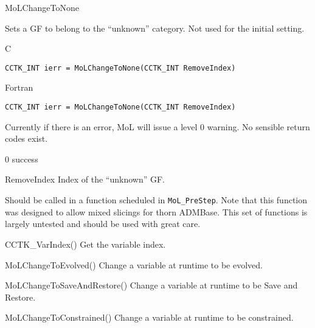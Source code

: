 \begin{FunctionDescription}{MoLChangeToNone}
  \label{CactusBase_MoL_MoLChangeToNone}
  
  Sets a GF to belong to the ``unknown'' category. Not used for the
  initial setting.

  \begin{SynopsisSection}
    \begin{Synopsis}{C}
\begin{verbatim}
CCTK_INT ierr = MoLChangeToNone(CCTK_INT RemoveIndex)
\end{verbatim}
    \end{Synopsis}
    \begin{Synopsis}{Fortran}
\begin{verbatim}
CCTK_INT ierr = MoLChangeToNone(CCTK_INT RemoveIndex)
\end{verbatim}
    \end{Synopsis}
  \end{SynopsisSection}

  \begin{ResultSection}
    \begin{ResultNote}
      Currently if there is an error, MoL will issue a level 0
      warning. No sensible return codes exist.
    \end{ResultNote}
    \begin{Result}{\rm 0}
      success
    \end{Result}
  \end{ResultSection}

  \begin{ParameterSection}
    \begin{Parameter}{RemoveIndex}
      Index of the ``unknown'' GF.
    \end{Parameter}
  \end{ParameterSection}

  \begin{Discussion}
    Should be called in a function scheduled in {\tt MoL\_PreStep}.
    Note that this function was designed to allow mixed slicings for
    thorn ADMBase. This set of functions is largely untested and
    should be used with great care.
  \end{Discussion}

  \begin{SeeAlsoSection}
    \begin{SeeAlso}{CCTK\_VarIndex()}
      Get the variable index.
    \end{SeeAlso}
    \begin{SeeAlso}{MoLChangeToEvolved()}
      Change a variable at runtime to be evolved.
    \end{SeeAlso}
    \begin{SeeAlso}{MoLChangeToSaveAndRestore()}
      Change a variable at runtime to be Save and Restore.
    \end{SeeAlso}
    \begin{SeeAlso}{MoLChangeToConstrained()}
      Change a variable at runtime to be constrained.
    \end{SeeAlso}
  \end{SeeAlsoSection}


\end{FunctionDescription}
